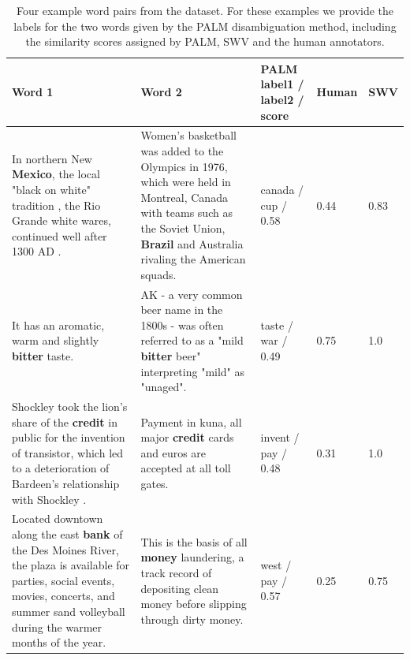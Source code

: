 \documentclass[11pt]{article}
\begin{document}
\begin{table}[t]
    \begin{tabular}{|p{5cm}|p{5cm}|p{2.5cm}|p{1cm}|p{1cm}|}
    \hline
    Word 1                                                                                                                                                                                                      & Word 2                                                                                                                                                                                                      & PALM label1 / label2 / score & Human & SWV  \\ \hline
    In northern New \textbf{Mexico}, the local "black on white" tradition , the Rio Grande white wares, continued well after 1300 AD .                                                           & Women's basketball was added to the Olympics in 1976, which were held in Montreal, Canada with teams such as the Soviet Union, \textbf{Brazil} and Australia rivaling the American squads.  & canada / cup / 0.58          & 0.44  & 0.83 \\ \hline
    It has an aromatic, warm and slightly \textbf{bitter} taste.                                                                                                                                  & AK - a very common beer name in the 1800s - was often referred to as a "mild \textbf{bitter} beer" interpreting "mild" as "unaged".                                                       & taste / war / 0.49           & 0.75  & 1.0  \\ \hline
    Shockley took the lion's share of the \textbf{credit} in public for the invention of transistor, which led to a deterioration of Bardeen's relationship with Shockley .                                         & Payment in kuna, all major \textbf{credit} cards and euros are accepted at all toll gates.                                                                                                                       & invent / pay / 0.48          & 0.31   & 1.0  \\ \hline
    Located downtown along the east \textbf{bank} of the Des Moines River, the plaza is available for parties, social events, movies, concerts, and summer sand volleyball during the warmer months of the year. & This is the basis of all \textbf{money} laundering, a track record of depositing clean money before slipping through dirty money.                                                                                & west / pay / 0.57            & 0.25   & 0.75 \\\hline
    \end{tabular}
    \caption{Four example word pairs from the dataset. For these examples we provide the labels for the two words given by the PALM disambiguation method, including the similarity scores assigned by PALM, SWV and the human annotators. }
    \label{task}
\end{table}
\end{document}
